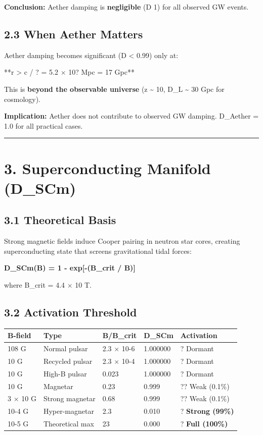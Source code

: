\documentclass[11pt]{article}
\begin{document}
\textbf{Conclusion:} Aether damping is \textbf{negligible} (D  1) for all observed GW events.

\subsection*{2.3 When Aether Matters}

Aether damping becomes significant (D < 0.99) only at:

**r > c / ? = 5.2 $\times$ 10? Mpc = 17 Gpc**

This is \textbf{beyond the observable universe} (z \textasciitilde{} 10, D\_L \textasciitilde{} 30 Gpc for cosmology).

\textbf{Implication:} Aether does not contribute to observed GW damping. D\_Aether = 1.0 for all practical cases.

\noindent\rule{\textwidth}{0.4pt}

\section*{3. Superconducting Manifold (D\_SCm)}

\subsection*{3.1 Theoretical Basis}

Strong magnetic fields induce Cooper pairing in neutron star cores, creating superconducting state that screens gravitational tidal forces:

\textbf{D\_SCm(B) = 1 - exp[-(B\_crit / B)]}

where B\_crit = 4.4 $\times$ 10 T.

\subsection*{3.2 Activation Threshold}

\begin{center}
\begin{longtable}{lllll}
\toprule
B-field & Type & B/B\_crit & D\_SCm & Activation \tabularnewline
\midrule
\endhead
108 G & Normal pulsar & 2.3 $\times$ 10-6 & 1.000000 & ? Dormant \tabularnewline
10 G & Recycled pulsar & 2.3 $\times$ 10-4 & 1.000000 & ? Dormant \tabularnewline
10 G & High-B pulsar & 0.023 & 1.000000 & ? Dormant \tabularnewline
10 G & Magnetar & 0.23 & 0.999 & ?? Weak (0.1\%) \tabularnewline
3 $\times$ 10 G & Strong magnetar & 0.68 & 0.999 & ?? Weak (0.1\%) \tabularnewline
10-4 G & Hyper-magnetar & 2.3 & 0.010 & ? \textbf{Strong (99\%)} \tabularnewline
10-5 G & Theoretical max & 23 & 0.000 & ? \textbf{Full (100\%)} \tabularnewline
\bottomrule
\end{longtable}
\end{center}
\end{document}
